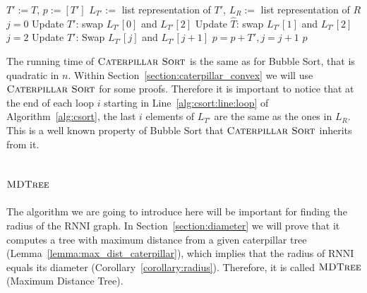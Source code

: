 \documentclass{amsart}
\newcommand{\rnni}{\mathrm{RNNI}}
\newcommand{\csort}{\textsc{Caterpillar Sort}}
\newcommand{\mdtree}{\textsc{MDTree}}
\begin{document}
\begin{algorithm}[H]
\caption{$\csort$($T,R$)}
\label{alg:csort}
\begin{algorithmic}[1]
\STATE $T':= T$, $p := [T']$
\STATE $L_{T'}:=$ list representation of $T'$, $L_R:=$ list representation of $R$
 \label{alg:csort:line:loop}
\STATE $j = 0$ 
\STATE Update $T'$: swap $L_{T'}[0]$ and $L_{T'}[2]$
\STATE Update $\hat T$: swap $L_{T'}[1]$ and $L_{T'}[2]$
\ENDIF
\STATE $j = 2$
\STATE Update $T'$: Swap $L_{T'}[j]$ and $L_{T'}[j+1]$
\STATE $p = p+T', j = j + 1$
\ENDWHILE
\ENDFOR
\RETURN $p$
\end{algorithmic}
\end{algorithm}

The running time of $\csort$ is the same as for Bubble Sort, that is quadratic in $n$.
Within Section~\ref{section:caterpillar_convex} we will use $\csort$ for some proofs.
Therefore it is important to notice that at the end of each loop $i$ starting in Line~\ref{alg:csort:line:loop} of Algorithm~\ref{alg:csort}, the last $i$ elements of $L_{T'}$ are the same as the ones in $L_R$.
This is a well known property of Bubble Sort that $\csort$ inherits from it.


\subsection{$\mdtree$}
\label{section:alg_mdtree}

The algorithm we are going to introduce here will be important for finding the radius of the $\rnni$ graph.
In Section~\ref{section:diameter} we will prove that it computes a tree with maximum distance from a given caterpillar tree (Lemma~\ref{lemma:max_dist_caterpillar}), which implies that the radius of $\rnni$ equals its diameter (Corollary~\ref{corollary:radius}).
Therefore, it is called $\mdtree$ (Maximum Distance Tree).
\end{document}
